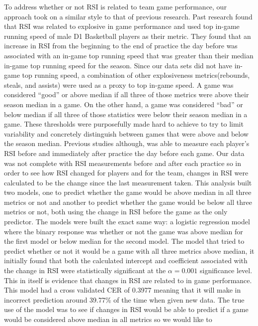 \documentclass[
]{article}
\begin{document}
To address whether or not RSI is related to team game performance, our
approach took on a similar style to that of previous research. Past
research found that RSI was related to explosive in game performance and
used top in-game running speed of male D1 Basketball players as their
metric. They found that an increase in RSI from the beginning to the end
of practice the day before was associated with an in-game top running
speed that was greater than their median in-game top running speed for
the season. Since our data sets did not have in-game top running speed,
a combination of other explosiveness metrics(rebounds, steals, and
assists) were used as a proxy to top in-game speed. A game was
considered ``good'' or above median if all three of those metrics were
above their season median in a game. On the other hand, a game was
considered ``bad'' or below median if all three of those statistics were
below their season median in a game. These thresholds were purposefully
made hard to achieve to try to limit variability and concretely
distinguish between games that were above and below the season median.
Previous studies although, was able to measure each player's RSI before
and immediately after practice the day before each game. Our data was
not complete with RSI measurements before and after each practice so in
order to see how RSI changed for players and for the team, changes in
RSI were calculated to be the change since the last measurement taken.
This analysis built two models, one to predict whether the game would be
above median in all three metrics or not and another to predict whether
the game would be below all three metrics or not, both using the change
in RSI before the game as the only predictor. The models were built the
exact same way: a logistic regression model where the binary response
was whether or not the game was above median for the first model or
below median for the second model. The model that tried to predict
whether or not it would be a game with all three metrics above median,
it initially found that both the calculated intercept and coefficient
associated with the change in RSI were statistically significant at the
\(\alpha = 0.001\) significance level. This in itself is evidence that
changes in RSI are related to in game performance. This model had a
cross validated CER of 0.3977 meaning that it will make in incorrect
prediction around 39.77\% of the time when given new data. The true use
of the model was to see if changes in RSI would be able to predict if a
game would be considered above median in all metrics so we would like to
\end{document}
